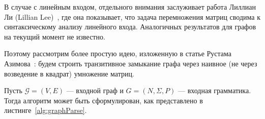 В случае с линейным входом, отдельного внимания заслуживает работа Лиллиан Ли (Lillian Lee)~\cite{Lee:2002:FCG:505241.505242}, где она показывает, что задача перемножения матриц сводима к синтаксическому анализу линейного входа. Аналогичных результатов для графов на текущий момент не известно.

Поэтому рассмотрим более простую идею, изложенную в статье Рустама Азимова~\cite{Azimov:2018:CPQ:3210259.3210264}: будем строить транзитивное замыкание графа через наивное (не через возведение в квадрат) умножение матриц.

Пусть $\mathcal{G} = (V, E)$ --- входной граф и $G = (N,\Sigma,P)$ --- входная грамматика. Тогда алгоритм может быть сформулирован, как представлено в листинге~\ref{alg:graphParse}.

\begin{algorithm}[H]


\end{algorithm}


